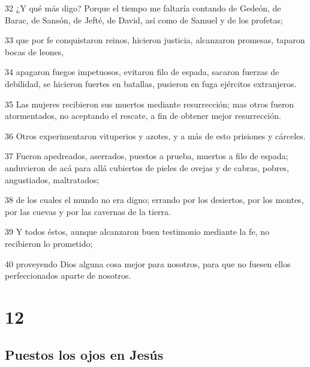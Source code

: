 \par 32 ¿Y qué más digo? Porque el tiempo me faltaría contando de Gedeón, de Barac, de Sansón, de Jefté, de David, así como de Samuel y de los profetas;
\par 33 que por fe conquistaron reinos, hicieron justicia, alcanzaron promesas, taparon bocas de leones,
\par 34 apagaron fuegos impetuosos, evitaron filo de espada, sacaron fuerzas de debilidad, se hicieron fuertes en batallas, pusieron en fuga ejércitos extranjeros.
\par 35 Las mujeres recibieron sus muertos mediante resurrección; mas otros fueron atormentados, no aceptando el rescate, a fin de obtener mejor resurrección.
\par 36 Otros experimentaron vituperios y azotes, y a más de esto prisiones y cárceles.
\par 37 Fueron apedreados, aserrados, puestos a prueba, muertos a filo de espada; anduvieron de acá para allá cubiertos de pieles de ovejas y de cabras, pobres, angustiados, maltratados;
\par 38 de los cuales el mundo no era digno; errando por los desiertos, por los montes, por las cuevas y por las cavernas de la tierra.
\par 39 Y todos éstos, aunque alcanzaron buen testimonio mediante la fe, no recibieron lo prometido;
\par 40 proveyendo Dios alguna cosa mejor para nosotros, para que no fuesen ellos perfeccionados aparte de nosotros.

\chapter{12}

\section*{Puestos los ojos en Jesús}

